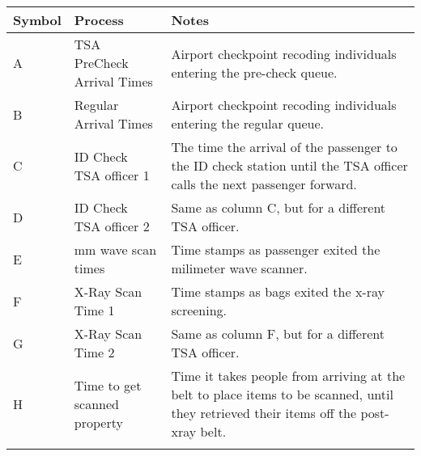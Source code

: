 \documentclass{mcmthesis}
\newlength\savedwidth
\newcommand\whline{\noalign{\global\savedwidth\arrayrulewidth
		\global\arrayrulewidth 1.2pt}%
	\hline
	\noalign{\global\arrayrulewidth\savedwidth}}
\newlength\savewidth
\newcommand\shline{\noalign{\global\savewidth\arrayrulewidth
		\global\arrayrulewidth 1.2pt}%
	\hline
	\noalign{\global\arrayrulewidth\savewidth}}
\begin{document}
\begin{appendices}
		\begin{table}[htbp]
			\centering
			\begin{tabular}{m{1.2cm}<{\centering}|m{3cm}<{\centering}|m{9cm}<{\centering}}
				\whline
				\textbf{Symbol}&\textbf{Process}&\textbf{Notes}\\
				\hline 
				A&TSA PreCheck Arrival Times&	Airport checkpoint recoding individuals entering the pre-check queue.\\
				\hline 
				B&Regular Arrival Times	&Airport checkpoint recoding individuals entering the regular queue.\\
				\hline 
				C&ID Check TSA officer 1	&The time the arrival of the passenger to the ID check station until the TSA officer calls the next passenger forward.\\
				\hline 
				D&ID Check TSA officer 2	&Same as column C, but for a different TSA officer.\\
				\hline 
				E&mm wave scan times	&Time stamps as passenger exited the milimeter wave scanner.\\
				\hline 
				F&X-Ray Scan Time 1	&Time stamps as bags exited the x-ray screening.\\
				\hline 
				G&X-Ray Scan Time 2	&Same as column F, but for a different TSA officer.\\
				\hline  
				H&Time to get scanned property	&Time it takes people from arriving at the belt to place items to be scanned, until they retrieved their items off the post-xray belt.\\
				\shline
			\end{tabular}
		\end{table}
		
		
		
		
		
		
		
		
		

\end{appendices}
\end{document}
